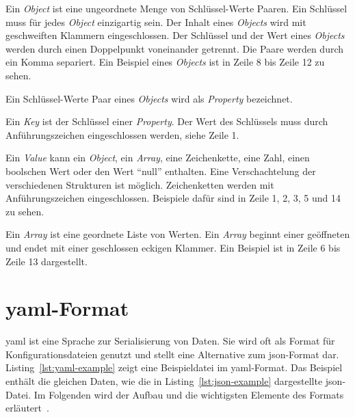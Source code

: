 \begin{description}
      \setlength\itemsep{-0.5cm}
      \item[Object]
            Ein \textit{Object} ist eine ungeordnete Menge von Schlüssel-Werte Paaren. Ein Schlüssel muss für jedes \textit{Object} einzigartig sein.
            Der Inhalt eines \textit{Objects} wird mit geschweiften Klammern eingeschlossen. Der Schlüssel und der Wert eines \textit{Objects} werden durch einen
            Doppelpunkt voneinander getrennt. Die Paare werden durch ein Komma separiert. Ein Beispiel eines \textit{Objects} ist in Zeile 8 bis Zeile 12 zu sehen.
      \item[Property] Ein Schlüssel-Werte Paar eines \textit{Objects} wird als \textit{Property} bezeichnet.
      \item[Key] Ein \textit{Key} ist der Schlüssel einer \textit{Property}. Der Wert des Schlüssels muss durch Anführungszeichen eingeschlossen werden, siehe Zeile 1.
      \item[Value] Ein \textit{Value} kann ein \textit{Object}, ein \textit{Array}, eine Zeichenkette, eine Zahl, einen boolschen Wert oder den Wert ``null''
            enthalten. Eine Verschachtelung der verschiedenen Strukturen ist möglich. Zeichenketten werden mit Anführungszeichen eingeschlossen.
            Beispiele dafür sind in Zeile 1, 2, 3, 5 und 14 zu sehen.
      \item[Array]
            Ein \textit{Array} ist eine geordnete Liste von Werten. Ein \textit{Array} beginnt einer geöffneten und endet mit einer geschlossen eckigen Klammer.
            Ein Beispiel ist in Zeile 6 bis Zeile 13 dargestellt.
\end{description}



\section{\acs{yaml}-Format}\label{sec:yaml-format}

\ac{yaml} ist eine Sprache zur Serialisierung von Daten. Sie wird oft als Format für Konfigurationsdateien genutzt
und stellt eine Alternative zum \acs{json}-Format dar.
Listing~\ref{lst:yaml-example} zeigt eine Beispieldatei im \ac{yaml}-Format. Das Beispiel enthält die gleichen Daten, wie die
in Listing~\ref{lst:json-example} dargestellte \acs{json}-Datei.
Im Folgenden wird der Aufbau und die wichtigsten Elemente des Formats erläutert~\cite{yaml-spacelift,yaml-cloudbees,yaml-javatpoint}.

